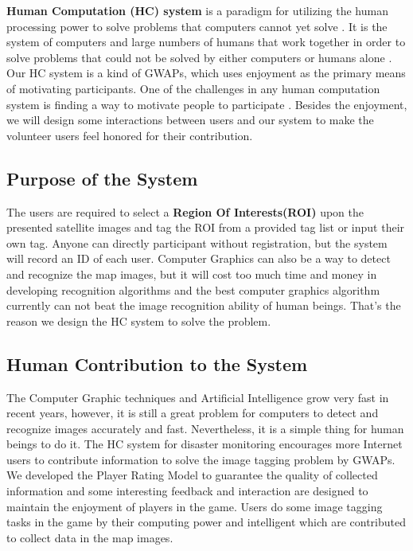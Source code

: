 \textbf{Human Computation (HC) system} is a paradigm for utilizing the human processing power to solve problems that 
computers cannot yet solve \cite{quinn2011human}. 
It is the system of computers and large numbers of humans that work together in order to solve problems that 
could not be solved by either computers or humans alone \cite{quinn2009taxonomy}.
Our HC system is a kind of GWAPs, which uses enjoyment as the primary means of motivating participants. 
One of the challenges in any human computation system is finding a way to motivate people 
to participate \cite{quinn2011human}. 
Besides the enjoyment, we will design some interactions between users and our system to 
make the volunteer users feel honored for their contribution.

\subsection{Purpose of the System}
The users are required to select a \textbf{Region Of Interests(ROI)} upon the presented satellite images 
and tag the ROI from a provided tag list or input their own tag. Anyone can directly participant 
without registration, but the system will record an ID of each user.
Computer Graphics can also be a way to detect and recognize the map images, but it will cost 
too much time and money in developing recognition algorithms and the best 
computer graphics algorithm currently can not beat the image recognition ability of human beings. 
That's the reason we design the HC system to solve the problem.

\subsection{Human Contribution to the System}
The Computer Graphic techniques and Artificial Intelligence grow very fast in recent years, 
however, it is still a great problem for computers to detect and recognize images accurately and fast.
Nevertheless, it is a simple thing for human beings to do it.
The HC system for disaster monitoring encourages more Internet users to contribute information 
to solve the image tagging problem by GWAPs. 
We developed the Player Rating Model to guarantee the quality of collected information 
and some interesting feedback and interaction are designed to maintain the enjoyment of players in the game.
Users do some image tagging tasks in the game by their computing power and intelligent 
which are contributed to collect data in the map images.

